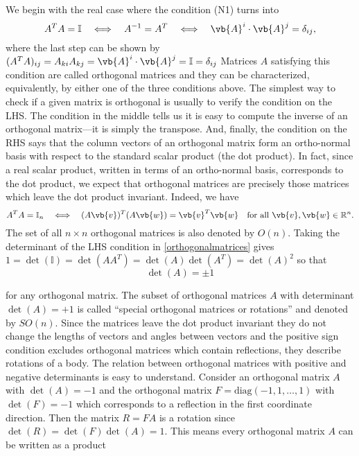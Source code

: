 \documentclass[a4paper,12pt]{report}
\begin{document}
We begin with the real case where the condition (N1) turns into
\begin{equation} \label{orthogonalmatrices} 
A^T A = \mathbb{I} \quad \Longleftrightarrow \quad A^{-1} = A^T \quad \Longleftrightarrow \quad \vb{A} ^i \cdot \vb{A} ^j = \delta_{ij},
\end{equation}
where the last step can be shown by \((A^{T}A)_{ij}  = A_{ki}A_{kj} = \vb{A} ^{i} \cdot \vb{A} ^{j}   =  \mathbb{I} = \delta _{ij}  \) 
Matrices \( A \) satisfying this condition are called orthogonal matrices and they can be characterized, equivalently, by either one of the three conditions above. The simplest way to check if a given matrix is orthogonal is usually to verify the condition on the LHS. The condition in the middle tells us it is easy to compute the inverse of an orthogonal matrix—it is simply the transpose. And, finally, the condition on the RHS says that the column vectors of an orthogonal matrix form an ortho-normal basis with respect to the standard scalar product (the dot product). In fact, since a real scalar product, written in terms of an ortho-normal basis, corresponds to the dot product, we expect that orthogonal matrices are precisely those matrices which leave the dot product invariant. Indeed, we have
\begin{equation}
A^T A = \mathbb{I}_n \quad \Longleftrightarrow \quad (A\vb{v} )^T (A\vb{w} ) = \vb{v} ^T \vb{w}  \quad \text{for all } \vb{v} , \vb{w}  \in \mathbb{R}^n.
\end{equation}
The set of all \( n \times n \) orthogonal matrices is also denoted by \( O(n) \). Taking the determinant of the LHS condition in \cref{orthogonalmatrices} gives \( 1 = \det(\mathbb{I}) = \det(AA^T) = \det(A) \det(A^T) = \det(A)^2 \) so that
\begin{equation}
\det(A) = \pm 1
\end{equation}

for any orthogonal matrix. The subset of orthogonal matrices \(A\) with determinant \(\det (A) = +1\) is called ``special orthogonal matrices or rotations'' and denoted by \(SO(n)\). Since the matrices leave the dot product invariant they do not change the lengths of vectors and angles between vectors and the positive sign condition excludes orthogonal matrices which contain reflections, they describe rotations of a body. The relation between orthogonal matrices with positive and negative determinants is easy to understand. Consider an orthogonal matrix \(A\) with \(\det (A) = -1\) and the orthogonal matrix \(F = \text{diag}  (-1,1,\ldots ,1)\) with \(\det (F) = -1\) which corresponds to a reflection in the first coordinate direction. Then the matrix \(R = FA\) is a rotation since \(\det (R) = \det (F)\det (A) = 1\). This means every orthogonal matrix \(A\) can be written as a product  
\end{document}
